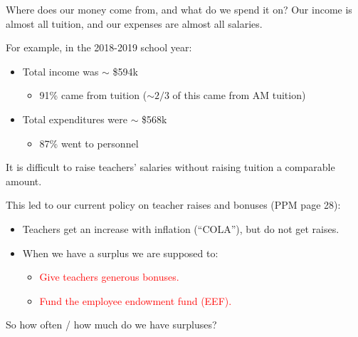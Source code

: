 \documentclass[8pt]{beamer}
\begin{document}

\begin{frame}{Where does our money come from, and what do we spend it on?}
%
Our income is almost all tuition, and our expenses are almost all salaries.

For example, in the 2018-2019 school year:
%
\begin{itemize}
%
\item Total income was $\sim$ \$594k
\begin{itemize}
    \item 91\% came from tuition ($\sim 2/3$ of this came from AM tuition)
\end{itemize}
%
\item Total expenditures were $\sim$ \$568k
\begin{itemize}
    \item 87\% went to personnel
\end{itemize}
%
\end{itemize}
%
\pause
It is difficult to raise teachers' salaries without
raising tuition a comparable amount.

This led to our current policy on teacher raises and bonuses (PPM page 28):
%
\begin{itemize}
%
\item Teachers get an increase with inflation (``COLA''), but do not get raises.
\item  When we have a surplus we are supposed to:
\begin{itemize}
\item \textcolor{red}{Give teachers generous bonuses.}
\item \textcolor{red}{Fund the employee endowment fund (EEF).}
\end{itemize}
%
\end{itemize}
%

So how often / how much do we have surpluses?

%
\end{frame}
\end{document}
